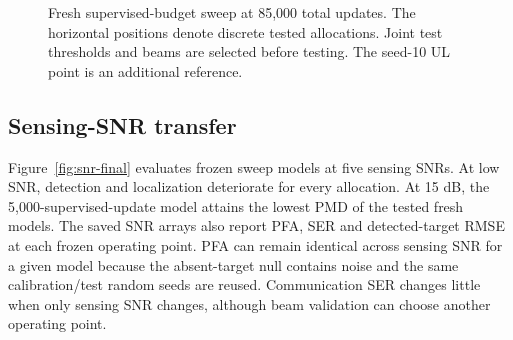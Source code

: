 \documentclass[conference]{IEEEtran}
\begin{document}
\begin{figure}[t]\centering{}
\caption{Fresh supervised-budget sweep at 85,000 total updates. The horizontal positions denote discrete tested allocations. Joint test thresholds and beams are selected before testing. The seed-10 UL point is an additional reference.}\label{fig:fraction-final}
\end{figure}\subsection{Sensing-SNR transfer}
Figure~\ref{fig:snr-final} evaluates frozen sweep models at five sensing SNRs. At low SNR, detection and localization deteriorate for every allocation. At 15 dB, the 5,000-supervised-update model attains the lowest PMD of the tested fresh models. The saved SNR arrays also report PFA, SER and detected-target RMSE at each frozen operating point. PFA can remain identical across sensing SNR for a given model because the absent-target null contains noise and the same calibration/test random seeds are reused. Communication SER changes little when only sensing SNR changes, although beam validation can choose another operating point.
\end{document}
